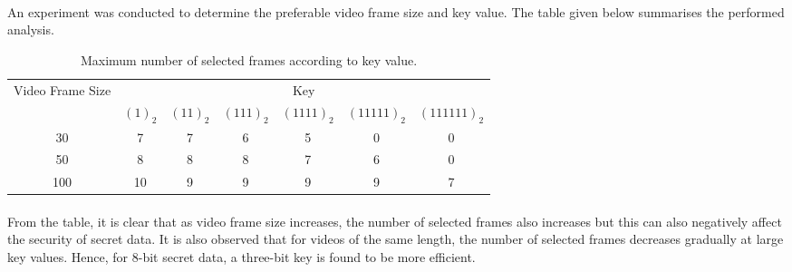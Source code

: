 {{        \paragraph{} An experiment was conducted to determine the preferable video frame size and key value. The table given below summarises the performed analysis.
        \begin{table}[h]
            \centering
            \begin{tabular}{ | c | c | c | c | c | c | c | }
                \hline
                \multirow{2}{*}{Video Frame Size} &
                    \multicolumn{6}{c|}{Key}\\
                \cline{2-7}
                & ${(1)}_2$ & ${(11)}_2$ & ${(111)}_2$ & ${(1111)}_2$ & ${(11111)}_2$ & ${(111111)}_2$\\ [0.5ex]
                \hline
                30 & 7 & 7 & 6 & 5 & 0 & 0\\
                \hline
                50 & 8 & 8 & 8 & 7 & 6 & 0\\
                \hline
                100 & 10 & 9 & 9 & 9 & 9 & 7\\
                \hline
            \end{tabular}
            \caption{\label{Table1}Maximum number of selected frames according to key value.}
        \end{table}
        \paragraph{} From the table, it is clear that as video frame size increases, the number of selected frames also increases but this can also negatively affect the security of secret data. It is also observed that for videos of the same length, the number of selected frames decreases gradually at large key values. Hence, for 8-bit secret data, a three-bit key is found to be more efficient.
    }
}
